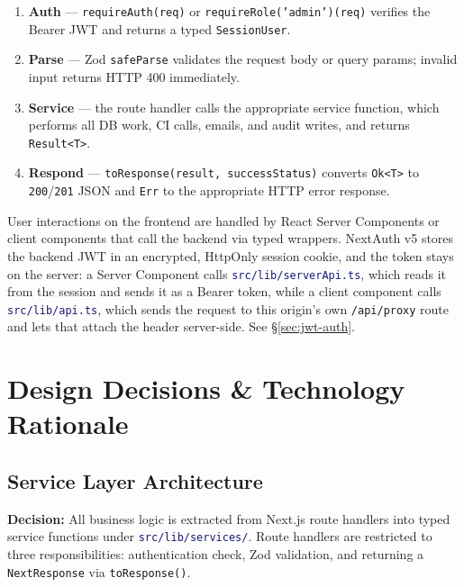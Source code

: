 \documentclass[12pt,a4paper,twoside]{report}
\newcommand{\code}[1]{\texttt{#1}}
\newcommand{\file}[1]{\texttt{\textcolor{MidnightBlue}{#1}}}
\begin{document}
\begin{enumerate}
  \item \textbf{Auth} — \code{requireAuth(req)} or \code{requireRole('admin')(req)}
        verifies the Bearer JWT and returns a typed \code{SessionUser}.
  \item \textbf{Parse} — Zod \code{safeParse} validates the request body or
        query params; invalid input returns HTTP 400 immediately.
  \item \textbf{Service} — the route handler calls the appropriate service
        function, which performs all DB work, CI calls, emails, and audit
        writes, and returns \code{Result<T>}.
  \item \textbf{Respond} — \code{toResponse(result, successStatus)} converts
        \code{Ok<T>} to \code{200}/\code{201} JSON and \code{Err} to the
        appropriate HTTP error response.
\end{enumerate}

User interactions on the frontend are handled by React Server Components or
client components that call the backend via typed wrappers. NextAuth v5 stores
the backend JWT in an encrypted, HttpOnly session cookie, and the token stays on
the server: a Server Component calls \file{src/lib/serverApi.ts}, which reads it
from the session and sends it as a Bearer token, while a client component calls
\file{src/lib/api.ts}, which sends the request to this origin's own
\code{/api/proxy} route and lets that attach the header server-side. See
\S\ref{sec:jwt-auth}.

\chapter{Design Decisions \& Technology Rationale}
\label{ch:design}

\section{Service Layer Architecture}
\label{sec:service-layer}

\textbf{Decision:} All business logic is extracted from Next.js route handlers
into typed service functions under \file{src/lib/services/}. Route handlers
are restricted to three responsibilities: authentication check, Zod validation,
and returning a \code{NextResponse} via \code{toResponse()}.
\end{document}
